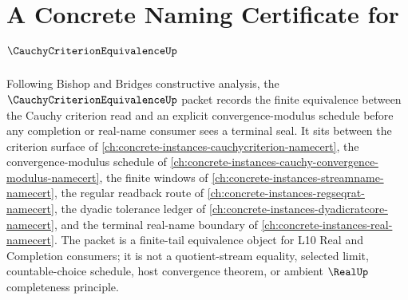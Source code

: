 \chapter{A Concrete Naming Certificate for $\CauchyCriterionEquivalenceUp$}
\label{ch:concrete-instances-cauchy-criterion-equivalence-namecert}

Following Bishop and Bridges constructive analysis, the $\CauchyCriterionEquivalenceUp$ packet records the finite equivalence between the Cauchy criterion read and an explicit convergence-modulus schedule before any completion or real-name consumer sees a terminal seal. It sits between the criterion surface of \autoref{ch:concrete-instances-cauchycriterion-namecert}, the convergence-modulus schedule of \autoref{ch:concrete-instances-cauchy-convergence-modulus-namecert}, the finite windows of \autoref{ch:concrete-instances-streamname-namecert}, the regular readback route of \autoref{ch:concrete-instances-regseqrat-namecert}, the dyadic tolerance ledger of \autoref{ch:concrete-instances-dyadicratcore-namecert}, and the terminal real-name boundary of \autoref{ch:concrete-instances-real-namecert}. The packet is a finite-tail equivalence object for L10 Real and Completion consumers; it is not a quotient-stream equality, selected limit, countable-choice schedule, host convergence theorem, or ambient $\RealUp$ completeness principle.

